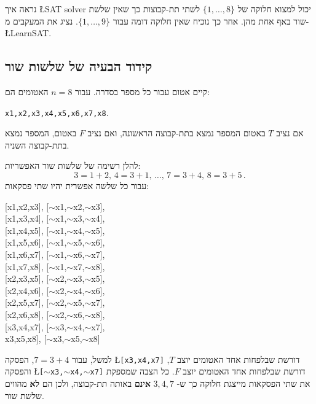 \documentclass[12pt,a4paper]{article}
\begin{document}
נראה איך
\L{SAT solver}
יכול למצוא חלוקה של 
$\{1,\ldots,8\}$
לשתי תת-קבוצות כך שאין שלשת שור באף אחת מהן. אחר כך נוכיח שאין חלוקה דומה עבור
$\{1,\ldots,9\}$.
נציג את המעקבים מ-%
\L{LearnSAT}.


\subsection*{קידוד הבעיה של שלשות שור}

קיים אטום עבור כל מספר בסדרה. עבור
$n=8$
האטומים הם:
\begin{center}
\texttt{x1,x2,x3,x4,x5,x6,x7,x8}.
\end{center}
אם נציב 
$T$
באטום המספר נמצא בתת-קבוצה הראשונה, ואם נציב 
$F$
באטום, המספר נמצא בתת-קבוצה השניה.

להלן רשימה של שלשות שור האפשריות:
\[
3=1+2,\, 4=3+1,\, \ldots,\, 7=3+4,\, 8=3+5\,.
\]
עבור כל שלשה אפשרית יהיו שתי פסקאות:
\begin{center}
\begin{ttfamily}
{[}x1,x2,x3], [$\sim$x1,$\sim$x2,$\sim$x3],\\
{[}x1,x3,x4], [$\sim$x1,$\sim$x3,$\sim$x4],\\
{[}x1,x4,x5], [$\sim$x1,$\sim$x4,$\sim$x5],\\
{[}x1,x5,x6], [$\sim$x1,$\sim$x5,$\sim$x6],\\
{[}x1,x6,x7], [$\sim$x1,$\sim$x6,$\sim$x7],\\
{[}x1,x7,x8], [$\sim$x1,$\sim$x7,$\sim$x8],\\
{[}x2,x3,x5], [$\sim$x2,$\sim$x3,$\sim$x5],\\
{[}x2,x4,x6], [$\sim$x2,$\sim$x4,$\sim$x6],\\
{[}x2,x5,x7], [$\sim$x2,$\sim$x5,$\sim$x7],\\
{[}x2,x6,x8], [$\sim$x2,$\sim$x6,$\sim$x8],\\
{[}x3,x4,x7], [$\sim$x3,$\sim$x4,$\sim$x7],\\
\hspace*{-5pt}{[}x3,x5,x8], [$\sim$x3,$\sim$x5,$\sim$x8]\\
\end{ttfamily}
\end{center}

למשל, עבור
$7=3+4$,
הפסקה
\L{\texttt{[x3,x4,x7]}}
דורשת שבלפחות אחד האטומים יוצב 
$T$,
והפסקה
\L{\texttt{[$\sim$x3,$\sim$x4,$\sim$x7]}}
דורשת שבלפחות אחד האטומים יוצב 
$F$.
כל הצבה שמספקת את שתי הפסקאות מייצגת חלוקה כך ש-%
$3,4,7$
\textbf{אינם}
באותה תת-קבוצה, ולכן הם
\textbf{לא}
מהווים שלשת שור.
\end{document}
